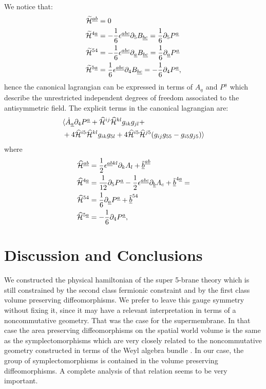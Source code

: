 \documentclass[a4paper,12pt]{article}
\def\CH{\widetilde{\cal{H}}}
\def\HCH{\widehat{\cal{H}}}
\def\c{\cal{C}}
\def\a{\underline{a}}
\def\b{\underline{b}}
\def\c{\underline{c}}
\begin{document}
We notice that:
\begin{equation*}\label{}
\begin{split}
{\CH}^{\a\b}&=0\\
{\CH}^{4\a}&=-{1\over 6}\epsilon^{\a\b\c}\partial_5B_{\b\c}={1\over 6}\partial_5P^{\a}\\
{\CH}^{54}&=-{1\over 6}\epsilon^{\a\b\c}\partial_{\a}B_{\b\c}={1\over 6}\partial_{\a}P^{\a}\\
{\CH}^{5\a}&={1\over
6}\epsilon^{\a\b\c}\partial_4B_{\b\c}=-{1\over6}\partial_4P^{\a},
\end{split}
\end{equation*}
hence the canonical lagrangian can be expressed in terms of
$A_{\a}$ and  $P^{\a}$  which describe the unrestricted
independent degrees of freedom associated to the antisymmetric
field. The explicit terms in the canonical lagrangian are:
\begin{equation}\label{}
\begin{split}
&\langle\dot{A}_{\a}\partial_4
P^{\a}+{\HCH}^{ij}{\HCH}^{kl}g_{ik}g_{jl}+\\
&+4{\HCH}^{i5}{\HCH}^{kl}g_{ik}g_{5l} +
4{\HCH}^{i5}{\HCH}^{j5}(g_{ij}g_{55}-g_{i5}g_{j5})\rangle
\end{split}
\end{equation}
where
\begin{equation*}\label{}
\begin{split}
{\HCH}^{\a\b}&={1\over 2}\epsilon^{\a\b kl}\partial_kA_{l}+\tilde{\b}^{\a\b}\\
{\HCH}^{4\a}&={1\over 12}\partial_5P^{\a}-{1\over 2}\epsilon^{\a\b\c}\partial_{\b}A_{c}+\tilde{\b}^{4\a}=\\
{\HCH}^{54}&={1\over 6}\partial_{\a}P^{\a}+\tilde{\b}^{54}\\
{\HCH}^{5\a}&=-{1\over6}\partial_4P^{\a},
\end{split}
\end{equation*}
\section{Discussion and Conclusions}

We constructed the physical hamiltonian of the super 5-brane
theory which is still constrained by the second class fermionic
constraint and by the first class volume preserving
diffeomorphisms. We prefer to leave this gauge symmetry without
fixing it, since it may have a relevant  interpretation in terms
of a noncommutative geometry. That was the case for the
supermembrane. In that case the area preserving diffeomorphisms on
the spatial world volume is the same as the symplectomorphisms
which are very closely related to the noncommutative geometry
constructed in terms of the Weyl  algebra bundle
\cite{Martin:2001zv}. In our case, the group of symplectomorphisms
is contained in  the volume preserving diffeomorphisms. A complete
analysis of that relation seems to be very important.
\end{document}
